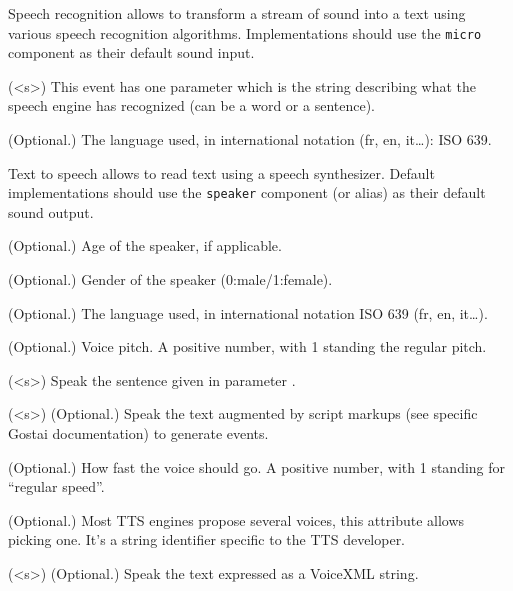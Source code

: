 Speech recognition allows to transform a stream of sound into a text
using various speech recognition algorithms. Implementations
should use the \lstinline{micro} component as their default sound input.

\begin{urbiscriptapi}
\item[hear](<s>) This event has one parameter which is the string describing
  what the speech engine has recognized (can be a word or a sentence).


\item[lang]{} (Optional.)  The language used, in international notation (fr,
  en, it…): ISO 639.
\end{urbiscriptapi}

Text to speech allows to read text using a speech synthesizer. Default
implementations should use the \lstinline{speaker} component (or alias) as
their default sound output.

\begin{urbiscriptapi}
\item[age]{} (Optional.) Age of the speaker, if applicable.


\item[gender]{} (Optional.) Gender of the speaker (0:male/1:female).


\item[lang]{} (Optional.) The language used, in international notation ISO 639
  (fr, en, it\ldots).


\item[pitch]{} (Optional.) Voice pitch.  A positive number, with 1 standing
  the regular pitch.


\item[say](<s>) Speak the sentence given in parameter .


\item[script](<s>) (Optional.) Speak the text  augmented by script
  markups (see specific Gostai documentation) to generate \urbi events.


\item[speed]{} (Optional.) How fast the voice should go.  A positive number,
  with 1 standing for ``regular speed''.


\item[voice]{} (Optional.) Most TTS engines propose several voices, this
  attribute allows picking one. It's a string identifier specific to the TTS
  developer.


\item[voicexml](<s>) (Optional.) Speak the text  expressed as a
  VoiceXML string.
\end{urbiscriptapi}


